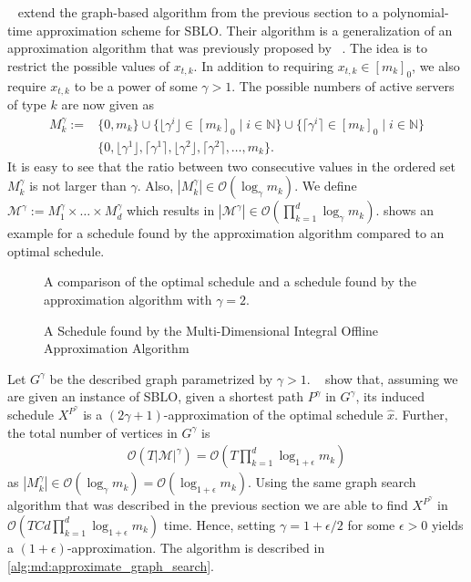 \citeauthor*{Albers2021_2}~\cite{Albers2021_2} extend the graph-based algorithm from the previous section to a polynomial-time approximation scheme for SBLO. Their algorithm is a generalization of an approximation algorithm that was previously proposed by \citeauthor*{Kappelmann2017}~\cite{Kappelmann2017}. The idea is to restrict the possible values of $x_{t,k}$. In addition to requiring $x_{t,k} \in [m_k]_0$, we also require $x_{t,k}$ to be a power of some $\gamma > 1$. The possible numbers of active servers of type $k$ are now given as \begin{align*}
    M_k^{\gamma} := &\{0, m_k\} \cup \{\lfloor\gamma^i\rfloor \in [m_k]_0 \mid i \in \mathbb{N}\} \cup \{\lceil\gamma^i\rceil \in [m_k]_0 \mid i \in \mathbb{N}\} \\
                    &\{0, \lfloor\gamma^1\rfloor, \lceil\gamma^1\rceil, \lfloor\gamma^2\rfloor, \lceil\gamma^2\rceil, \dots, m_k\}.
\end{align*} It is easy to see that the ratio between two consecutive values in the ordered set $M_k^{\gamma}$ is not larger than $\gamma$. Also, $|M_k^{\gamma}| \in \mathcal{O}(\log_{\gamma} m_k)$. We define $\mathcal{M}^{\gamma} := M_1^{\gamma} \times \dots \times M_d^{\gamma}$ which results in $|\mathcal{M}^{\gamma}| \in \mathcal{O}(\prod_{k=1}^d \log_{\gamma} m_k)$.  shows an example for a schedule found by the approximation algorithm compared to an optimal schedule.

\begin{figure}
    \centering
    [TODO]

    A comparison of the optimal schedule and a schedule found by the approximation algorithm with $\gamma = 2$.
    \caption{A Schedule found by the Multi-Dimensional Integral Offline Approximation Algorithm}
    \label{fig:a_schedule_found_by_the_multi_dimensional_integral_offline_approximation_algorithm}
\end{figure}

Let $G^{\gamma}$ be the described graph parametrized by $\gamma > 1$. \citeauthor*{Albers2021_2}~\cite{Albers2021_2} show that, assuming we are given an instance of SBLO, given a shortest path $P^{\gamma}$ in $G^{\gamma}$, its induced schedule $X^{P^{\gamma}}$ is a $(2\gamma + 1)$-approximation of the optimal schedule $\hat{x}$. Further, the total number of vertices in $G^{\gamma}$ is \begin{align*}
    \mathcal{O}(T |\mathcal{M}|^{\gamma}) = \mathcal{O}(T \prod_{k=1}^d \log_{1+\epsilon} m_k)
\end{align*} as $|M_k^{\gamma}| \in \mathcal{O}(\log_{\gamma} m_k) = \mathcal{O}(\log_{1 + \epsilon} m_k)$. Using the same graph search algorithm that was described in the previous section we are able to find $X^{P^{\gamma}}$ in $\mathcal{O}(T C d \prod_{k=1}^d \log_{1 + \epsilon} m_k)$ time. Hence, setting $\gamma = 1 + \epsilon / 2$ for some $\epsilon > 0$ yields a $(1+\epsilon)$-approximation. The algorithm is described in \cref{alg:md:approximate_graph_search}.

